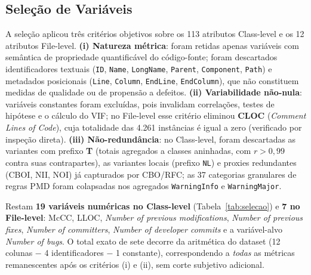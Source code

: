 \documentclass[12pt]{article}
\begin{document}
\subsection{Seleção de Variáveis}

A seleção aplicou três critérios objetivos sobre os 113 atributos Class-level e os 12 atributos File-level. \textbf{(i) Natureza métrica}: foram retidas apenas variáveis com semântica de propriedade quantificável do código-fonte; foram descartados identificadores textuais (\texttt{ID}, \texttt{Name}, \texttt{LongName}, \texttt{Parent}, \texttt{Component}, \texttt{Path}) e metadados posicionais (\texttt{Line}, \texttt{Column}, \texttt{EndLine}, \texttt{EndColumn}), que não constituem medidas de qualidade ou de propensão a defeitos. \textbf{(ii) Variabilidade não-nula}: variáveis constantes foram excluídas, pois invalidam correlações, testes de hipótese e o cálculo do VIF; no File-level esse critério eliminou \textbf{CLOC} (\textit{Comment Lines of Code}), cuja totalidade das 4.261 instâncias é igual a zero (verificado por inspeção direta). \textbf{(iii) Não-redundância}: no Class-level, foram descartadas as variantes com prefixo \textbf{T} (totais agregados a classes aninhadas, com $r>0{,}99$ contra suas contrapartes), as variantes locais (prefixo \texttt{NL}) e proxies redundantes (CBOI, NII, NOI) já capturados por CBO/RFC; as 37 categorias granulares de regras PMD foram colapsadas nos agregados \texttt{WarningInfo} e \texttt{WarningMajor}.

Restam \textbf{19 variáveis numéricas no Class-level} (Tabela~\ref{tab:selecao}) e \textbf{7 no File-level}: McCC, LLOC, \textit{Number of previous modifications}, \textit{Number of previous fixes}, \textit{Number of committers}, \textit{Number of developer commits} e a variável-alvo \textit{Number of bugs}. O total exato de sete decorre da aritmética do dataset (12 colunas $-$ 4 identificadores $-$ 1 constante), correspondendo a \emph{todas} as métricas remanescentes após os critérios (i) e (ii), sem corte subjetivo adicional.
\end{document}
